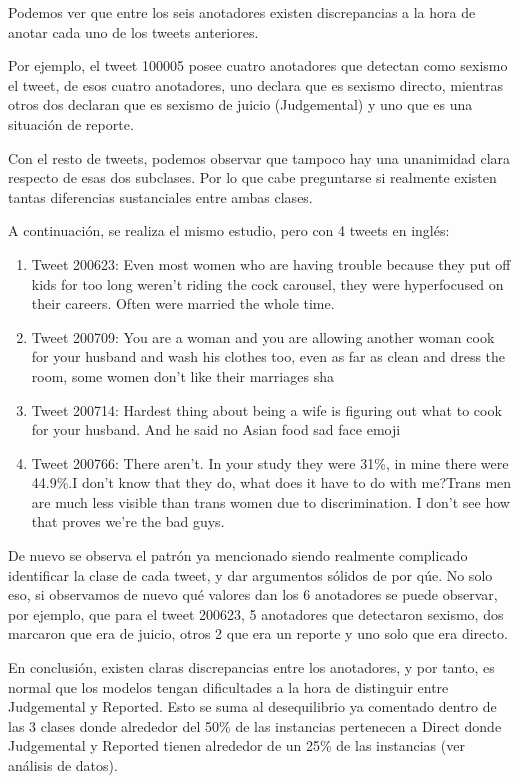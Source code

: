 Podemos ver que entre los seis anotadores existen discrepancias a la hora de anotar cada uno de los tweets anteriores.

Por ejemplo, el tweet 100005 posee cuatro anotadores que detectan como sexismo el tweet, de esos cuatro anotadores, uno declara que es sexismo directo, mientras otros dos declaran que es sexismo de juicio (Judgemental) y uno que es una situación de reporte.

Con el resto de tweets, podemos observar que tampoco  hay una unanimidad clara respecto de esas dos subclases. Por lo que cabe preguntarse si realmente existen tantas diferencias sustanciales entre ambas clases.

A continuación, se realiza el mismo estudio, pero con 4 tweets en inglés:


\begin{enumerate}
        \item Tweet 200623: Even most women who are having trouble because they put off kids for too long weren't riding the cock carousel, they were hyperfocused on their careers. Often were married the whole time.
        \item Tweet 200709: You are a woman and you are allowing another woman cook for your husband and wash his clothes too, even as far as clean and dress the room, some women don't like their marriages sha
        \item Tweet 200714: Hardest thing about being a wife is figuring out what to cook for your husband. And he said no Asian food sad face emoji
        \item Tweet 200766: There aren't. In your study they were 31\%, in mine there were 44.9\%.I don't know that they do, what does it have to do with me?Trans men are much less visible than trans women due to discrimination. I don't see how that proves we're the bad guys.
\end{enumerate}

De nuevo se observa el patrón ya mencionado siendo realmente complicado identificar la clase de cada tweet, y dar argumentos sólidos de por qúe. No solo eso, si observamos de nuevo qué valores dan los 6 anotadores se puede observar, por ejemplo, que para el tweet 200623, 5 anotadores que detectaron sexismo, dos marcaron que era de juicio, otros 2 que era un reporte y uno solo que era directo.

En conclusión, existen claras discrepancias entre los anotadores, y por tanto, es normal que los modelos tengan dificultades a la hora de distinguir entre Judgemental y Reported. Esto se suma al desequilibrio ya comentado dentro de las 3 clases donde alrededor del 50\% de las instancias pertenecen a Direct donde Judgemental y Reported tienen alrededor de un 25\% de las instancias (ver análisis de datos).

